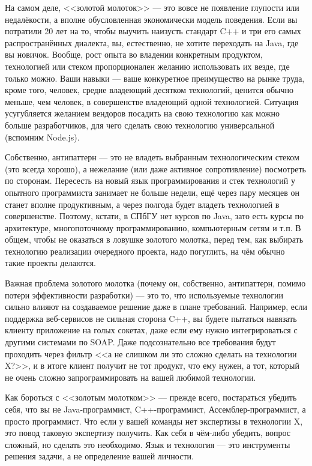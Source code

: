 \documentclass{../../text-style}
\begin{document}
На самом деле, <<золотой молоток>> --- это вовсе не появление глупости или недалёкости, а вполне обусловленная экономически модель поведения. Если вы потратили 20 лет на то, чтобы выучить наизусть стандарт C++ и три его самых распространённых диалекта, вы, естественно, не хотите переходать на Java, где вы новичок. Вообще, рост опыта во владении конкретным продуктом, технологией или стеком пропорционален желанию использовать их везде, где только можно. Ваши навыки --- ваше конкуретное преимущество на рынке труда, кроме того, человек, средне владеющий десятком технологий, ценится обычно меньше, чем человек, в совершенстве владеющий одной технологией. Ситуация усугубляется желанием вендоров посадить на свою технологию как можно больше разработчиков, для чего сделать свою технологию универсальной (вспомним Node.js).

Собственно, антипаттерн --- это не владеть выбранным технологическим стеком (это всегда хорошо), а нежелание (или даже активное сопротивление) посмотреть по сторонам. Пересесть на новый язык программирования и стек технологий у опытного программиста занимает не больше недели, ещё через пару месяцев он станет вполне продуктивным, а через полгода будет владеть технологией в совершенстве. Поэтому, кстати, в СПбГУ нет курсов по Java, зато есть курсы по архитектуре, многопоточному программированию, компьютерным сетям и т.п. В общем, чтобы не оказаться в ловушке золотого молотка, перед тем, как выбирать технологию реализации очередного проекта, надо погуглить, на чём обычно такие проекты делаются.

Важная проблема золотого молотка (почему он, собственно, антипаттерн, помимо потери эффективности разработки) --- это то, что используемые технологии сильно влияют на создаваемое решение даже в плане требований. Например, если поддержка веб-сервисов не сильная сторона C++, вы будете пытаться навязать клиенту приложение на голых сокетах, даже если ему нужно интегрироваться с другими системами по SOAP. Даже подсознательно все требования будут проходить через фильтр <<а не слишком ли это сложно сделать на технологии X?>>, и в итоге клиент получит не тот продукт, что ему нужен, а тот, который не очень сложно запрограммировать на вашей любимой технологии.

Как бороться с <<золотым молотком>> --- прежде всего, постараться убедить себя, что вы не Java-программист, C++-программист, Ассемблер-программист, а просто программист. Что если у вашей команды нет экспертизы в технологии X, это повод таковую экспертизу получить. Как себя в чём-либо убедить, вопрос сложный, но сделать это необходимо. Язык и технология --- это инструменты решения задачи, а не определение вашей личности.
\end{document}
